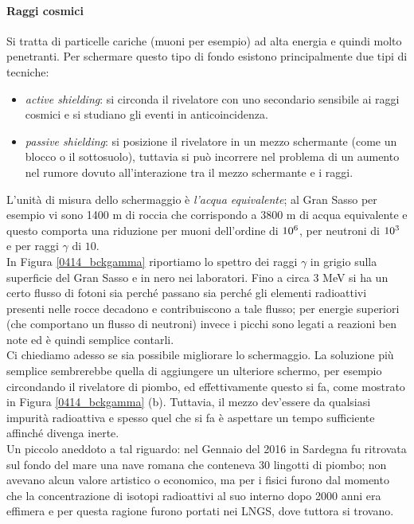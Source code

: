 \paragraph{Raggi cosmici}
Si tratta di particelle cariche (muoni per esempio) ad alta energia e quindi molto penetranti. Per schermare questo tipo di fondo esistono principalmente due tipi di tecniche:
\begin{itemize}
	\item \textit{active shielding}: si circonda il rivelatore con uno secondario sensibile ai raggi cosmici e si studiano gli eventi in anticoincidenza.
	\item \textit{passive shielding}: si posizione il rivelatore in un mezzo schermante (come un blocco o il sottosuolo), tuttavia si può incorrere nel problema di un aumento nel rumore dovuto all'interazione tra il mezzo schermante e i raggi.
\end{itemize}
L'unità di misura dello schermaggio è \textit{l'acqua equivalente}; al Gran Sasso per esempio vi sono 1400 m di roccia che corrispondo a 3800 m di acqua equivalente e questo comporta una riduzione per muoni dell'ordine di $10^{6}$, per neutroni di $10^{3}$ e per raggi $\gamma$ di $10$.\\
In Figura \ref{0414_bckgamma} riportiamo lo spettro dei raggi $\gamma$ in grigio sulla superficie del Gran Sasso e in nero nei laboratori.
Fino a circa 3 MeV si ha un certo flusso di fotoni sia perché passano sia perché gli elementi radioattivi presenti nelle rocce decadono e contribuiscono a tale flusso; per energie superiori (che comportano un flusso di neutroni) invece i picchi sono legati a reazioni ben note ed è quindi semplice contarli.\\
Ci chiediamo adesso se sia possibile migliorare lo schermaggio. La soluzione più semplice sembrerebbe quella di aggiungere un ulteriore schermo, per esempio circondando il rivelatore di piombo, ed effettivamente questo si fa, come mostrato in Figura \ref{0414_bckgamma} (b). Tuttavia, il mezzo dev'essere  da qualsiasi impurità radioattiva e spesso quel che si fa è aspettare un tempo sufficiente affinché divenga inerte.\\ 
Un piccolo aneddoto a tal riguardo: nel Gennaio del 2016 in Sardegna fu ritrovata sul fondo del mare una nave romana che conteneva 30 lingotti di piombo; non avevano alcun valore artistico o economico, ma per i fisici furono  dal momento che la concentrazione di isotopi radioattivi al suo interno dopo 2000 anni era effimera e per questa ragione furono portati nei LNGS, dove tuttora si trovano.

